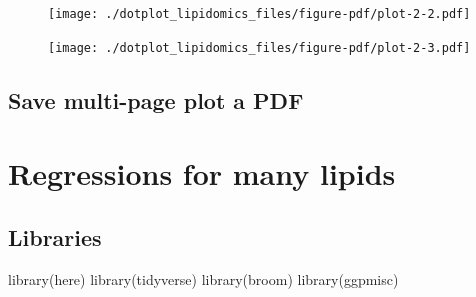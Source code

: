 \documentclass[
  letterpaper,
  DIV=11,
  numbers=noendperiod]{scrreprt}
\newenvironment{Shaded}{\begin{snugshade}}{\end{snugshade}}
\newcommand{\AttributeTok}[1]{\textcolor[rgb]{0.40,0.45,0.13}{#1}}
\newcommand{\ConstantTok}[1]{\textcolor[rgb]{0.56,0.35,0.01}{#1}}
\newcommand{\DecValTok}[1]{\textcolor[rgb]{0.68,0.00,0.00}{#1}}
\newcommand{\FunctionTok}[1]{\textcolor[rgb]{0.28,0.35,0.67}{#1}}
\newcommand{\NormalTok}[1]{\textcolor[rgb]{0.00,0.23,0.31}{#1}}
\newcommand{\SpecialCharTok}[1]{\textcolor[rgb]{0.37,0.37,0.37}{#1}}
\newcommand{\StringTok}[1]{\textcolor[rgb]{0.13,0.47,0.30}{#1}}
\begin{document}
\begin{figure}[H]

{\centering \texttt{[image: ./dotplot\_lipidomics\_files/figure-pdf/plot-2-2.pdf]}

}

\end{figure}

\begin{figure}[H]

{\centering \texttt{[image: ./dotplot\_lipidomics\_files/figure-pdf/plot-2-3.pdf]}

}

\end{figure}

\hypertarget{save-multi-page-plot-a-pdf-1}{%
\section{Save multi-page plot a
PDF}\label{save-multi-page-plot-a-pdf-1}}

\begin{Shaded}
\end{Shaded}

\hypertarget{regressions-for-many-lipids}{%
\chapter{Regressions for many
lipids}\label{regressions-for-many-lipids}}

\hypertarget{libraries-4}{%
\section{Libraries}\label{libraries-4}}

\begin{Shaded}
\begin{Highlighting}[]
\FunctionTok{library}\NormalTok{(here)}
\FunctionTok{library}\NormalTok{(tidyverse)}
\FunctionTok{library}\NormalTok{(broom)}
\FunctionTok{library}\NormalTok{(ggpmisc)}
\end{Highlighting}
\end{Shaded}
\end{document}
